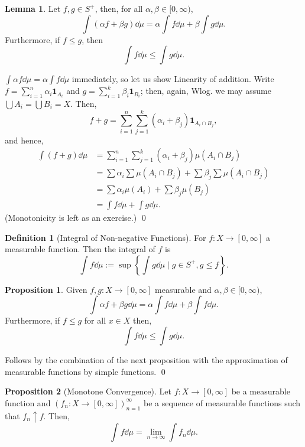 \documentclass[
]{article}
\theoremstyle{definition}
\newtheorem{prop}{Proposition}
\theoremstyle{definition}
\newtheorem{definition}{Definition}[section]
\newtheorem{lemma}{Lemma}[section]
\begin{document}
\begin{lemma}
  Let \(f, g \in S^+\), then, for all \(\alpha, \beta \in [0, \infty)\), 
  \[\int (\alpha f + \beta g) \dd \mu = \alpha \int f \dd \mu + \beta \int g \dd \mu.\]
  Furthermore, if \(f \le g\), then 
  \[\int f \dd \mu \le \int g \dd \mu.\]
\end{lemma}
\proof

\(\int \alpha f \dd \mu = \alpha \int f \dd \mu\) immediately, so let us
show Linearity of addition. Write
\(f = \sum_{i = 1}^n \alpha_i \mathbf{1}_{A_i}\) and
\(g = \sum_{i = 1}^k \beta_i \mathbf{1}_{B_i}\); then, again, Wlog. we
may assume \(\bigcup A_i = \bigcup B_i = X\). Then,
\[f + g = \sum_{i = 1}^n \sum_{j = 1}^k (\alpha_i + \beta_j) \mathbf{1}_{A_i \cap B_j},\]
and hence, \[\begin{split}
    \int (f + g) \dd \mu 
      & = \sum_{i = 1}^n \sum_{j = 1}^k (\alpha_i + \beta_j) \mu(A_i \cap B_j)\\
      & = \sum \alpha_i \sum \mu(A_i \cap B_j) + \sum \beta_j \sum \mu(A_i \cap B_j)\\
      & = \sum \alpha_i \mu(A_i) + \sum \beta_j \mu(B_j)\\
      & = \int f \dd \mu + \int g \dd \mu.
  \end{split}\] (Monotonicity is left as an exercise.) \qed

\begin{definition}[Integral of Non-negative Functions]
  For \(f : X \to [0, \infty]\) a measurable function. Then the integral 
  of \(f\) is 
  \[\int f \dd \mu := \sup \left\{\int g \dd \mu \mid g \in S^+, g \le f\right\}.\]
\end{definition}

\begin{prop}
  Given \(f, g : X \to [0, \infty]\) measurable and \(\alpha, \beta \in [0, \infty)\),
  \[\int \alpha f + \beta g \dd \mu = \alpha \int f \dd \mu + \beta \int f \dd \mu.\] 
  Furthermore, if \(f \le g\) for all \(x \in X\) then, 
  \[\int f \dd \mu \le \int g \dd \mu.\]
\end{prop}
\proof

Follows by the combination of the next proposition with the
approximation of measurable functions by simple functions. \qed

\begin{prop}[Monotone Convergence]
  Let \(f : X \to [0, \infty]\) be a measurable function and 
  \((f_n : X \to [0, \infty])_{n = 1}^\infty\) be a sequence of measurable functions 
  such that \(f_n \uparrow f\). Then,
  \[\int f \dd \mu = \lim_{n \to \infty} \int f_n \dd \mu.\]
\end{prop}
\proof
\end{document}
